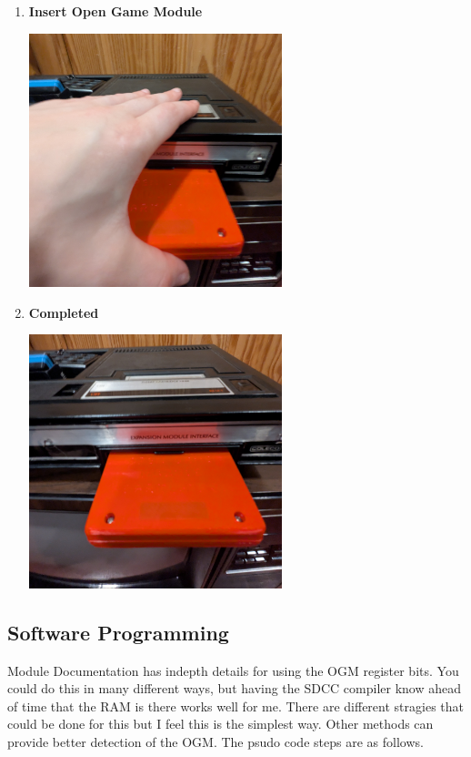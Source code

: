 \begin{enumerate}
  \item \textbf{Insert Open Game Module} \par \includegraphics[width=0.58\textwidth,keepaspectratio]{img/insert_ogm.jpg}
  \item \textbf{Completed} \par \includegraphics[width=0.58\textwidth,keepaspectratio]{img/completed_ogm.jpg}
\end{enumerate}

\subsection{Software Programming}
\par
Module Documentation has in\-depth details for using the OGM register bits. You could do this in many different ways, but
having the SDCC compiler know ahead of time that the RAM is there works well for me. There are different stragies that could be done for this
but I feel this is the simplest way. Other methods can provide better detection of the OGM. The psudo code steps are as follows.

